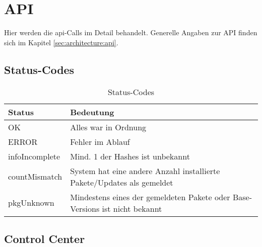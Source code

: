 \begin{comment}

Source: https://redmine.upd89.org/redmine/projects/upd89/wiki/API

\end{comment}

\chapter{API}

Hier werden die \gls{api}-Calls im Detail behandelt. Generelle Angaben zur API finden sich im Kapitel \ref{sec:architecture:api}.



\section*{Status-Codes}

\begin{table}[H]
    \centering
    \caption{Status-Codes}
    \label{api:codes}
    \begin{tabular}{ll}
        \hline
        \textbf{Status} & \textbf{Bedeutung}                                                          \\ \hline
        OK              & Alles war in Ordnung                                                        \\
        ERROR           & Fehler im Ablauf                                                            \\
        infoIncomplete  & Mind. 1 der Hashes ist unbekannt                                            \\
        countMismatch   & System hat eine andere Anzahl installierte Pakete/Updates als gemeldet      \\
        pkgUnknown      & Mindestens eines der gemeldeten Pakete oder Base-Versions ist nicht bekannt \\ \hline
    \end{tabular}
\end{table}


\section*{Control Center}

